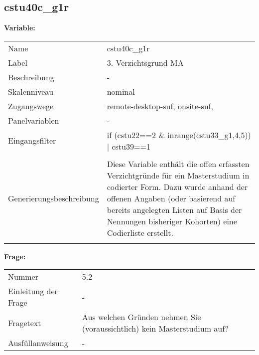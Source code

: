 	
	
	\subsection{cstu40c\_g1r}
	\label{subSection:cstu40c_g1r}

	\noindent\textbf{Variable:}\\
		\begin{tabular}{lL{11.3cm}}
			\label{tableVariable:cstu40c_g1r}
			Name & cstu40c\_g1r \\
			Label & 3. Verzichtsgrund MA \\
			Beschreibung & - \\
			Skalenniveau & nominal \\
			Zugangswege &
				remote-desktop-suf,
				onsite-suf,
 \\
			Panelvariablen & -
			 \\
			Eingangsfilter & if (cstu22==2 \& inrange(cstu33\_g1,4,5)) | cstu39==1 \\
 \\
					Generierungsbeschreibung & Diese Variable enthält die offen erfassten Verzichtgründe für ein Masterstudium in codierter Form. Dazu wurde anhand der offenen Angaben (oder basierend auf bereits angelegten Listen auf Basis der Nennungen bisheriger Kohorten) eine Codierliste erstellt.
				 \\	
			 \\
		\end{tabular}

		\vspace*{1 cm}
		\noindent\textbf{Frage:}\\
		\begin{tabular}{lL{11.3cm}}
			\label{tableQuestion:cstu40c_g1r}
			Nummer & 5.2 \\
			Einleitung der Frage & - \\
			Fragetext & Aus welchen Gründen nehmen Sie (voraussichtlich) kein Masterstudium auf? \\
			Ausfüllanweisung & - \\
		\end{tabular}





